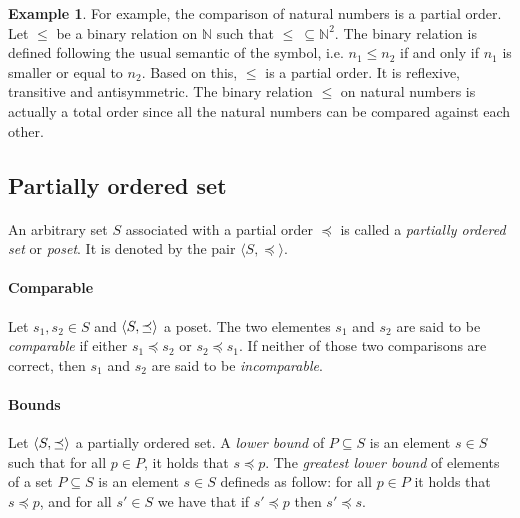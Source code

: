 \documentclass[letterpaper]{article}
\DeclarePairedDelimiter{\tuple}{\langle}{\rangle}
\theoremstyle{definition}
\newtheorem{example}{Example}[subsection]
\begin{document}
\begin{example}

For example, the comparison of natural numbers is a partial order.
Let $\leq$ be a binary relation on $\mathbb{N}$
such that $\leq \ \subseteq \mathbb{N}^2$. The binary relation is defined
following the usual semantic of the symbol, i.e. $n_1 \leq n_2$ if and
only if $n_1$ is smaller or equal to $n_2$.
Based on this, $\leq$ is a partial order. It is
reflexive, transitive and antisymmetric.
The binary relation $\leq$ on natural numbers is actually a total
order since all the natural numbers can be compared against each other.

\end{example}

\subsection{Partially ordered set}

\paragraph{}

An arbitrary set $S$ associated with a partial order $\preceq$
is called a \textit{partially ordered set} or \textit{poset}.
It is denoted by the pair $\langle S, \preceq \rangle$.

\paragraph{Comparable}

Let $s_1, s_2 \in S$ and $\tuple{S, \preceq}$ a poset.
The two elementes $s_1$ and $s_2$ are said to be \textit{comparable} if either
$s_1 \preceq s_2$ or $s_2 \preceq s_1$. If neither of those two comparisons
are correct, then $s_1$ and $s_2$ are said to be \textit{incomparable}.


\paragraph{Bounds} Let $\tuple{S, \preceq}$ a partially ordered set.
A \textit{lower bound} of $P \subseteq S$ is an element $s \in S$
such that for all $p \in P$, it holds that $s \preceq p$.
The \textit{greatest lower bound} of elements of a set $P \subseteq S$
is an element $s \in S$ defineds as follow:
for all $p \in P$
it holds that $s \preceq p$, and for all $s' \in S$ we have that
if $s' \preceq p$ then $s' \preceq s$.
\end{document}
